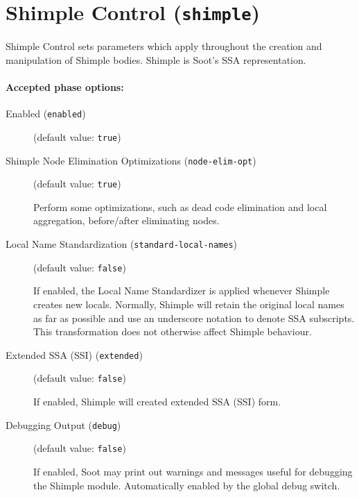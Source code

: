 \documentclass{article}
\begin{document}
\section{Shimple Control ({\tt shimple})}


\par

Shimple Control sets parameters which apply throughout the
creation and manipulation of Shimple bodies. Shimple is Soot's
SSA representation.


\paragraph{Accepted phase options:} 

\begin{description}

\item[Enabled ({\tt enabled})]
(default value: {\tt true})






\item[Shimple Node Elimination Optimizations ({\tt node-elim-opt})]
(default value: {\tt true})




          
\par

          Perform some optimizations, such as dead code elimination
          and local aggregation, before/after eliminating nodes.
         
         


\item[Local Name Standardization ({\tt standard-local-names})]
(default value: {\tt false})




            If enabled, the Local Name Standardizer is applied whenever
            Shimple creates new locals.  Normally, Shimple will retain
            the original local names as far as possible and use an
            underscore notation to denote SSA subscripts.  This
            transformation does not otherwise affect Shimple
            behaviour.
          


\item[Extended SSA (SSI) ({\tt extended})]
(default value: {\tt false})




            If enabled, Shimple will created extended SSA (SSI) form.
          


\item[Debugging Output ({\tt debug})]
(default value: {\tt false})




            If enabled, Soot may print out warnings and messages
            useful for debugging the Shimple module.  Automatically
            enabled by the global debug switch.
          


\end{description}
\end{document}
